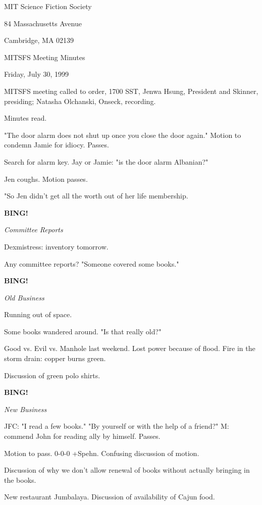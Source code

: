 \documentclass[12pt]{article}
\newcommand{\bing}{{\bf BING!} }
\newcommand{\goto}[1]{\bing \vskip 12pt \centerline{{\em{#1}}}}
\begin{document}
\begin{center}

MIT Science Fiction Society 

84 Massachusetts Avenue

Cambridge, MA 02139

\vspace{12pt}

MITSFS Meeting Minutes 

Friday, July 30, 1999

\end{center}
 
\vspace{18pt}

\setlength{\parskip}{6pt}

\noindent
MITSFS meeting called to order, 1700 SST,
Jenwa Hsung, President and Skinner, presiding; Natasha Olchanski, Onseck, recording.

Minutes read.

"The door alarm does not shut up once you close the door again." Motion to condemn Jamie for idiocy. Passes.

Search for alarm key. Jay or Jamie: "is the door alarm Albanian?"

Jen coughs. Motion passes.

"So Jen didn't get all the worth out of her life membership.

\goto{Committee Reports}

Dexmistress: inventory tomorrow.

Any committee reports? "Someone covered some books."

\goto{Old Business}

Running out of space.

Some books wandered around. "Is that really old?"

Good vs. Evil vs. Manhole last weekend. Lost power because of flood. Fire in the storm drain: copper burns green.

Discussion of green polo shirts.

\goto{New Business}

JFC: "I read a few books." "By yourself or with the help of a friend?" M: commend John for reading ally by himself. Passes.

Motion to pass. 0-0-0 +Spehn. Confusing discussion of motion.

Discussion of why we don't allow renewal of books without actually bringing in the books.

New restaurant Jumbalaya. Discussion of availability of Cajun food.
\end{document}
